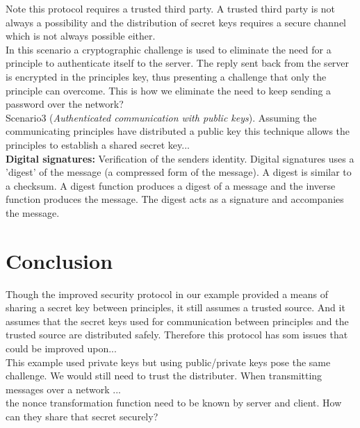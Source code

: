 Note this protocol requires a trusted third party. A trusted third party is not always a possibility and the distribution of secret keys requires a secure channel which is not always possible either. \\

In this scenario a cryptographic challenge is used to eliminate the need for a principle to authenticate itself to the server. The reply sent back from the server is encrypted in the principles key, thus presenting a challenge that only the principle can overcome. This is how we eliminate the need to keep sending a password over the network?\\

Scenario3 (\textit{Authenticated communication with public keys}). Assuming the communicating principles have distributed a public key this technique allows the principles to establish a shared secret key...\\

    
\textbf{Digital signatures:} Verification of the senders identity. Digital signatures uses a 'digest' of the message (a compressed form of the message). A digest is similar to a checksum. A digest function produces a digest of a message and the inverse function produces the message. The digest acts as a signature and accompanies the message.   
















 

  

\section{Conclusion}

Though the improved security protocol in our example provided a means of sharing a secret key between principles, it still assumes a trusted source. And it assumes that the secret keys used for communication between principles and the trusted source are distributed safely. Therefore this protocol has som issues that could be improved upon... \\

This example used private keys but using public/private keys pose the same challenge. We would still need to trust the distributer. When transmitting messages over a network ...   \\

the nonce transformation function need to be known by server and client. How can they share that secret securely?















